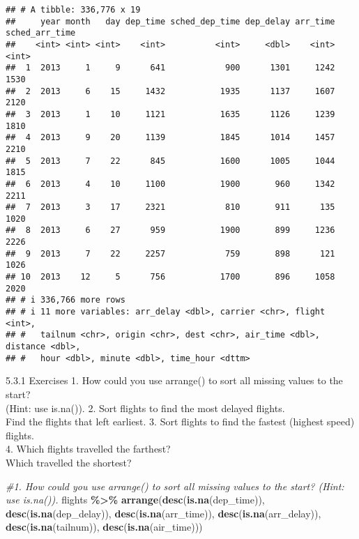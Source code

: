 \documentclass[
]{article}
\newenvironment{Shaded}{\begin{snugshade}}{\end{snugshade}}
\newcommand{\CommentTok}[1]{\textcolor[rgb]{0.56,0.35,0.01}{\textit{#1}}}
\newcommand{\FunctionTok}[1]{\textcolor[rgb]{0.13,0.29,0.53}{\textbf{#1}}}
\newcommand{\NormalTok}[1]{#1}
\newcommand{\SpecialCharTok}[1]{\textcolor[rgb]{0.81,0.36,0.00}{\textbf{#1}}}
\begin{document}
\begin{verbatim}
## # A tibble: 336,776 x 19
##     year month   day dep_time sched_dep_time dep_delay arr_time sched_arr_time
##    <int> <int> <int>    <int>          <int>     <dbl>    <int>          <int>
##  1  2013     1     9      641            900      1301     1242           1530
##  2  2013     6    15     1432           1935      1137     1607           2120
##  3  2013     1    10     1121           1635      1126     1239           1810
##  4  2013     9    20     1139           1845      1014     1457           2210
##  5  2013     7    22      845           1600      1005     1044           1815
##  6  2013     4    10     1100           1900       960     1342           2211
##  7  2013     3    17     2321            810       911      135           1020
##  8  2013     6    27      959           1900       899     1236           2226
##  9  2013     7    22     2257            759       898      121           1026
## 10  2013    12     5      756           1700       896     1058           2020
## # i 336,766 more rows
## # i 11 more variables: arr_delay <dbl>, carrier <chr>, flight <int>,
## #   tailnum <chr>, origin <chr>, dest <chr>, air_time <dbl>, distance <dbl>,
## #   hour <dbl>, minute <dbl>, time_hour <dttm>
\end{verbatim}

5.3.1 Exercises 1. How could you use arrange() to sort all missing
values to the start?\\
(Hint: use is.na()). 2. Sort flights to find the most delayed flights.\\
Find the flights that left earliest. 3. Sort flights to find the fastest
(highest speed) flights.\\
4. Which flights travelled the farthest?\\
Which travelled the shortest?

\begin{Shaded}
\begin{Highlighting}[]
\CommentTok{\#1. How could you use arrange() to sort all missing values to the start? (Hint: use is.na()).}
\NormalTok{flights }\SpecialCharTok{\%\textgreater{}\%} 
    \FunctionTok{arrange}\NormalTok{(}\FunctionTok{desc}\NormalTok{(}\FunctionTok{is.na}\NormalTok{(dep\_time)),}
           \FunctionTok{desc}\NormalTok{(}\FunctionTok{is.na}\NormalTok{(dep\_delay)),}
           \FunctionTok{desc}\NormalTok{(}\FunctionTok{is.na}\NormalTok{(arr\_time)), }
           \FunctionTok{desc}\NormalTok{(}\FunctionTok{is.na}\NormalTok{(arr\_delay)),}
           \FunctionTok{desc}\NormalTok{(}\FunctionTok{is.na}\NormalTok{(tailnum)),}
           \FunctionTok{desc}\NormalTok{(}\FunctionTok{is.na}\NormalTok{(air\_time)))}
\end{Highlighting}
\end{Shaded}
\end{document}
